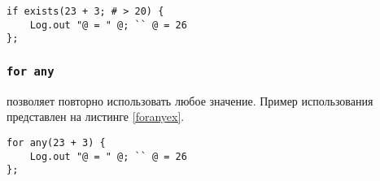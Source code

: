 \begin{lstlisting}[caption=Использование if exist, label=ifexistsex]
if exists(23 + 3; # > 20) {
	Log.out "@ = " @; `` @ = 26
};
\end{lstlisting}

\subsubsection{\lstinline|for any|}

 позволяет повторно использовать любое значение. Пример использования представлен на листинге \ref{foranyex}.

\begin{lstlisting}[caption=Использование for any, label=foranyex]
for any(23 + 3) {
	Log.out "@ = " @; `` @ = 26
};
\end{lstlisting}

